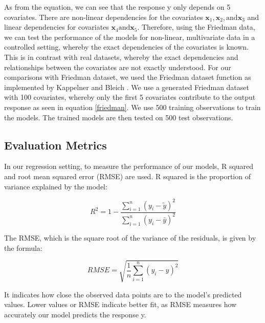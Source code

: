 \documentclass{usiinftr}
\begin{document}
As from the equation, we can see that the response y only depends on 5 covariates. There are non-linear dependencies for the covariates $\boldsymbol{x}_{1}, \boldsymbol{x}_{2}, \text{
and} \boldsymbol{x}_{3}$ and linear dependencies for covariates $\boldsymbol{x}_{4} \text{
and} \boldsymbol{x}_{5}$. Therefore, using the Friedman data, we can test the performance of the models for non-linear, multivariate data in a controlled setting, whereby the exact dependencies of the covariates is known. This is in contrast with real datasets, whereby the exact dependencies and relationships between the covariates are not exactly understood. For our comparisons with Friedman dataset, we used the Friedman dataset function as implemented by Kappelner and Bleich \cite{14}. We use a generated Friedman dataset with 100 covariates, whereby only the first 5 covariates contribute to the output response as seen in equation \ref{friedman}. We use 500 training observations to train the models. The trained models are then tested on 500 test observations.

\subsection{Evaluation Metrics}
In our regression setting, to measure the performance of our models, R squared and root mean squared error (RMSE) are used. R squared is the proportion of variance explained by the model: 

\begin{equation}
R^{2}=1-\frac{\sum_{i=1}^{n}\left(y_{i}-\tilde{y}\right)^{2}}{\sum_{i=1}^{n}\left(y_{i}-\bar{y}\right)^{2}}
\end{equation}

The RMSE, which is the square root of the variance of the residuals, is given by the formula: 

\begin{equation}
R M S E=\sqrt{\frac{1}{n} \sum_{i=1}^{n}\left(y_{i}-\hat{y}\right)^{2}}
\end{equation}

It indicates how close the observed data points are to the model's predicted values. Lower values or RMSE indicate better fit, as RMSE measures how accurately our model predicts the response y.  
\end{document}
